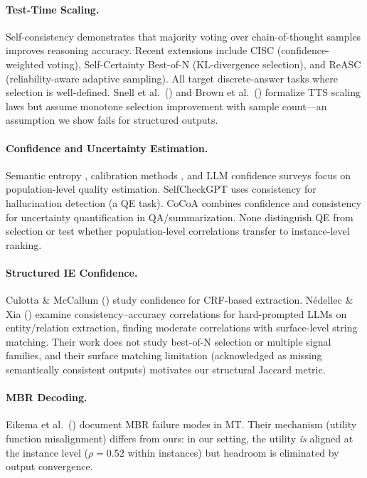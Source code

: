 \documentclass[11pt]{article}
\begin{document}
\paragraph{Test-Time Scaling.} Self-consistency \cite{wang2023selfconsistency} demonstrates that majority voting over chain-of-thought samples improves reasoning accuracy. Recent extensions include CISC \cite{cisc2025} (confidence-weighted voting), Self-Certainty Best-of-N \cite{selfcertainty2026} (KL-divergence selection), and ReASC \cite{reasc2026} (reliability-aware adaptive sampling). All target discrete-answer tasks where selection is well-defined. Snell et al.\ (\citeyear{snell2024scaling}) and Brown et al.\ (\citeyear{brown2024tts}) formalize TTS scaling laws but assume monotone selection improvement with sample count---an assumption we show fails for structured outputs.

\paragraph{Confidence and Uncertainty Estimation.} Semantic entropy \cite{kuhn2023semantic}, calibration methods \cite{kadavath2022language,guo2017calibration}, and LLM confidence surveys \cite{uqsurvey2025,confsurvey2024} focus on population-level quality estimation. SelfCheckGPT \cite{manakul2023selfcheckgpt} uses consistency for hallucination detection (a QE task). CoCoA \cite{cocoa2025} combines confidence and consistency for uncertainty quantification in QA/summarization. None distinguish QE from selection or test whether population-level correlations transfer to instance-level ranking.

\paragraph{Structured IE Confidence.} Culotta \& McCallum (\citeyear{culotta2004confidence}) study confidence for CRF-based extraction. N\'{e}dellec \& Xia (\citeyear{nedellec2026}) examine consistency--accuracy correlations for hard-prompted LLMs on entity/relation extraction, finding moderate correlations with surface-level string matching. Their work does not study best-of-N selection or multiple signal families, and their surface matching limitation (acknowledged as missing semantically consistent outputs) motivates our structural Jaccard metric.

\paragraph{MBR Decoding.} Eikema et al.\ (\citeyear{eikema2022sampling}) document MBR failure modes in MT. Their mechanism (utility function misalignment) differs from ours: in our setting, the utility \emph{is} aligned at the instance level ($\rho = 0.52$ within instances) but headroom is eliminated by output convergence.
\end{document}
